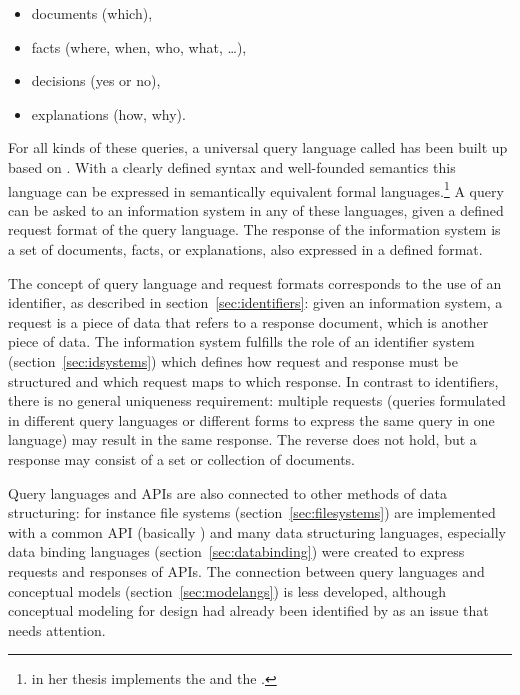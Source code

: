 \begin{itemize}
	\item documents (which),
	\item facts (where, when, who, what, \ldots),
	\item decisions (yes or no),
	\item explanations (how, why).
\end{itemize}

For all kinds of these queries, a universal query language called
 has been built up based on
 \cite{Reiner1988,Reiner1991}. With a clearly defined
syntax and well-founded semantics this language can be expressed in
semantically equivalent formal
languages.\footnote{\textcite{Reiner1988,Reiner1991} in her thesis implements
	the  and the .} A query can be asked to an information system in any
of these languages, given a defined request format of the query language. The 
response of the information system is a set of documents, facts, or
explanations, also expressed in a defined format.

The concept of query language and request formats corresponds to the use of an
identifier, as described in section~\ref{sec:identifiers}: given an information
system, a request is a piece of data that refers to a response document, which
is another piece of data.  The information system fulfills the role of an
identifier system (section~\ref{sec:idsystems}) which defines how request and
response must be structured and which request maps to which response. In
contrast to identifiers, there is no general uniqueness requirement: multiple
requests (queries formulated in different query languages or different forms to
express the same query in one language) may result in the same response. The
reverse does not hold, but a response may consist of a set or collection of
documents.

Query languages and APIs are also connected to other methods of data
structuring: for instance file systems (section~\ref{sec:filesystems}) are
implemented with a common API (basically ) and many data structuring
languages, especially data binding languages (section~\ref{sec:databinding})
were created to express requests and responses of APIs. The
connection between query languages and conceptual models
(section~\ref{sec:modelangs}) is less developed, although conceptual modeling
for  design had already been identified by \textcite{Chen1999} as an
issue that needs attention.

